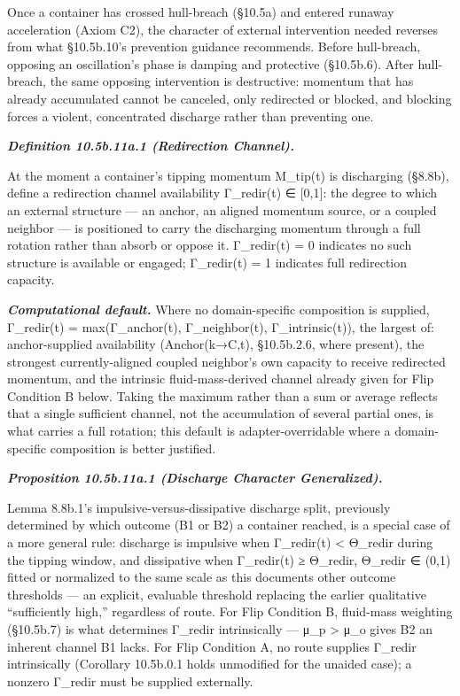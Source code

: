 \documentclass[
]{article}
\begin{document}
Once a container has crossed hull-breach (§10.5a) and entered runaway
acceleration (Axiom C2), the character of external intervention needed
reverses from what §10.5b.10's prevention guidance recommends. Before
hull-breach, opposing an oscillation's phase is damping and protective
(§10.5b.6). After hull-breach, the same opposing intervention is
destructive: momentum that has already accumulated cannot be canceled,
only redirected or blocked, and blocking forces a violent, concentrated
discharge rather than preventing one.

\emph{\textbf{Definition 10.5b.11a.1 (Redirection Channel).}}

At the moment a container's tipping momentum M\_tip(t) is discharging
(§8.8b), define a redirection channel availability Γ\_redir(t) ∈
{[}0,1{]}: the degree to which an external structure --- an anchor, an
aligned momentum source, or a coupled neighbor --- is positioned to
carry the discharging momentum through a full rotation rather than
absorb or oppose it. Γ\_redir(t) = 0 indicates no such structure is
available or engaged; Γ\_redir(t) = 1 indicates full redirection
capacity.

\emph{\textbf{Computational default.}} Where no domain-specific
composition is supplied, Γ\_redir(t) = max(Γ\_anchor(t), Γ\_neighbor(t),
Γ\_intrinsic(t)), the largest of: anchor-supplied availability
(Anchor(k→C,t), §10.5b.2.6, where present), the strongest
currently-aligned coupled neighbor's own capacity to receive redirected
momentum, and the intrinsic fluid-mass-derived channel already given for
Flip Condition B below. Taking the maximum rather than a sum or average
reflects that a single sufficient channel, not the accumulation of
several partial ones, is what carries a full rotation; this default is
adapter-overridable where a domain-specific composition is better
justified.

\emph{\textbf{Proposition 10.5b.11a.1 (Discharge Character
Generalized).}}

Lemma 8.8b.1's impulsive-versus-dissipative discharge split, previously
determined by which outcome (B1 or B2) a container reached, is a special
case of a more general rule: discharge is impulsive when Γ\_redir(t)
\textless{} Θ\_redir during the tipping window, and dissipative when
Γ\_redir(t) ≥ Θ\_redir, Θ\_redir ∈ (0,1) fitted or normalized to the
same scale as this document\textquotesingle s other outcome thresholds
--- an explicit, evaluable threshold replacing the earlier qualitative
``sufficiently high,'' regardless of route. For Flip Condition B,
fluid-mass weighting (§10.5b.7) is what determines Γ\_redir
intrinsically --- μ\_p \textgreater{} μ\_o gives B2 an inherent channel
B1 lacks. For Flip Condition A, no route supplies Γ\_redir intrinsically
(Corollary 10.5b.0.1 holds unmodified for the unaided case); a nonzero
Γ\_redir must be supplied externally.
\end{document}
